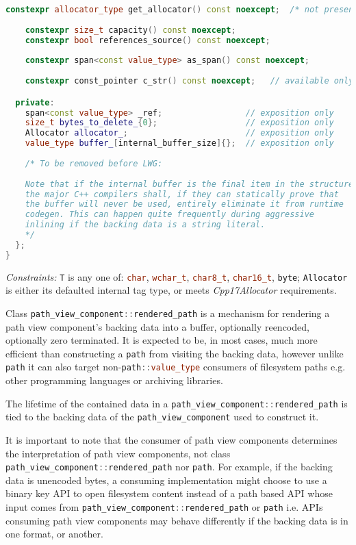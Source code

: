 \documentclass[11pt]{article}
\newcommand{\code}[2][cpp]{\lstinline[language=#1,basicstyle=\small\ttfamily]{#2}}
\newcommand{\desc}[1]{\textit{#1}}
\newcommand{\constraints}{\desc{Constraints: }}
\begin{document}
\begin{lstlisting}[language=cpp]
    constexpr allocator_type get_allocator() const noexcept;  /* not present if default_rendered_path_allocator tag type was used */
    
    constexpr size_t capacity() const noexcept;
    constexpr bool references_source() const noexcept;
    
    constexpr span<const value_type> as_span() const noexcept;
    
    constexpr const_pointer c_str() const noexcept;   // available only if zero_terminated and non-byte backing

  private:
    span<const value_type> _ref;                 // exposition only
    size_t bytes_to_delete_{0};                  // exposition only
    Allocator allocator_;                        // exposition only
    value_type buffer_[internal_buffer_size]{};  // exposition only
    
    /* To be removed before LWG:
    
    Note that if the internal buffer is the final item in the structure,
    the major C++ compilers shall, if they can statically prove that
    the buffer will never be used, entirely eliminate it from runtime
    codegen. This can happen quite frequently during aggressive
    inlining if the backing data is a string literal.
    */
  };
}
\end{lstlisting}

\constraints \code{T} is any one of: \code{char}, \code{wchar_t}, \code{char8_t}, \code{char16_t}, \code{byte}; \code{Allocator} is either its defaulted internal tag type, or meets \emph{Cpp17Allocator} requirements.

Class \code{path_view_component::rendered_path} is a mechanism for rendering a path view component's backing data into a buffer, optionally reencoded, optionally zero terminated. It is expected to be, in most cases, much more efficient than constructing a \code{path} from visiting the backing data, however unlike \code{path} it can also target non-\code{path::value_type} consumers of filesystem paths e.g. other programming languages or archiving libraries.

The lifetime of the contained data in a \code{path_view_component::rendered_path} is tied to the backing data of the \code{path_view_component} used to construct it.

It is important to note that the consumer of path view components determines the interpretation of path view components, not class \code{path_view_component::rendered_path} nor \code{path}. For example, if the backing data is unencoded bytes, a consuming implementation might choose to use a binary key API to open filesystem content instead of a path based API whose input comes from \code{path_view_component::rendered_path} or \code{path} i.e. APIs consuming path view components may behave differently if the backing data is in one format, or another.
\end{document}
